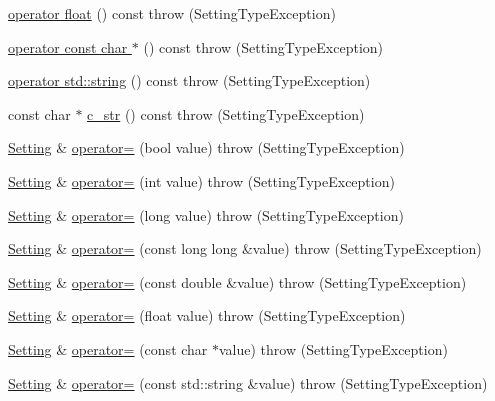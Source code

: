 \begin{DoxyCompactItemize}
\hyperlink{classlibconfig_1_1Setting_afe1936d947131f08bc0b0e0824ada07a}{operator float} () const   throw (\-Setting\-Type\-Exception)
\item 
\hyperlink{classlibconfig_1_1Setting_aaec2d0eca01cca2974dcf32c7246d80f}{operator const char $\ast$} () const   throw (\-Setting\-Type\-Exception)
\item 
\hyperlink{classlibconfig_1_1Setting_aec0236d3c1a6d3626b0e46c84dd6fee7}{operator std\-::string} () const   throw (\-Setting\-Type\-Exception)
\item 
const char $\ast$ \hyperlink{classlibconfig_1_1Setting_a34a7bdb5b70b200ea070db5f0918f0f0}{c\-\_\-str} () const   throw (\-Setting\-Type\-Exception)
\item 
\hyperlink{classlibconfig_1_1Setting}{Setting} \& \hyperlink{classlibconfig_1_1Setting_aaa35268d7f5b451a3fd853a41e4ce60a}{operator=} (bool value)  throw (\-Setting\-Type\-Exception)
\item 
\hyperlink{classlibconfig_1_1Setting}{Setting} \& \hyperlink{classlibconfig_1_1Setting_ad466b44815dfe9ae2177765d2242911a}{operator=} (int value)  throw (\-Setting\-Type\-Exception)
\item 
\hyperlink{classlibconfig_1_1Setting}{Setting} \& \hyperlink{classlibconfig_1_1Setting_a4caadef35e5cee2d9a8f659c31786a65}{operator=} (long value)  throw (\-Setting\-Type\-Exception)
\item 
\hyperlink{classlibconfig_1_1Setting}{Setting} \& \hyperlink{classlibconfig_1_1Setting_a25baf662804c2847b00d9e1f7ca5cde5}{operator=} (const long long \&value)  throw (\-Setting\-Type\-Exception)
\item 
\hyperlink{classlibconfig_1_1Setting}{Setting} \& \hyperlink{classlibconfig_1_1Setting_a7488663acd784d99bc0c9b2daac9a941}{operator=} (const double \&value)  throw (\-Setting\-Type\-Exception)
\item 
\hyperlink{classlibconfig_1_1Setting}{Setting} \& \hyperlink{classlibconfig_1_1Setting_af15ab13df839c6a45231a1af1eda8163}{operator=} (float value)  throw (\-Setting\-Type\-Exception)
\item 
\hyperlink{classlibconfig_1_1Setting}{Setting} \& \hyperlink{classlibconfig_1_1Setting_a74867e0937b039a73e1ee58e2b6e25c8}{operator=} (const char $\ast$value)  throw (\-Setting\-Type\-Exception)
\item 
\hyperlink{classlibconfig_1_1Setting}{Setting} \& \hyperlink{classlibconfig_1_1Setting_af7ed1af6a57ef12c20ef91c441642a34}{operator=} (const std\-::string \&value)  throw (\-Setting\-Type\-Exception)
\item 

\end{DoxyCompactItemize}
